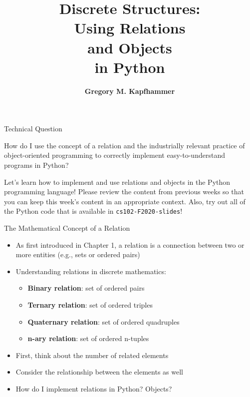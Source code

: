 \documentclass[14pt,aspectratio=169]{beamer}
\title{\vspace*{-.25in}Discrete Structures: \\ Using Relations\\ and Objects\\ in Python}
\author{{\bf Gregory M. Kapfhammer}}
\institute[shortinst]{{\bf Department of Computer Science, Allegheny College}}
\begin{document}
{
  \begin{frame}
    \titlepage
  \end{frame}
}

%
\begin{frame}{Technical Question}
  \hspace*{.25in}
  \begin{minipage}{5in}
    \vspace*{.1in}
    \begin{center}
      {\large How do I use the concept of a relation and the industrially
      relevant practice of object-oriented programming to correctly implement
      easy-to-understand programs in Python?}
    \end{center}
  \end{minipage}
  \vspace{2ex}
  \begin{center}
    \small Let's learn how to implement and use relations and objects in the
    Python programming language! Please review the content from previous weeks
    so that you can keep this week's content in an appropriate context. Also,
    try out all of the Python code that is available in {\tt cs102-F2020-slides}!
  \end{center}
\end{frame}

%
\begin{frame}{The Mathematical Concept of a Relation}
  \begin{itemize}
    \item As first introduced in Chapter 1, a relation is a connection between
      two or more entities (e.g., sets or ordered pairs)
      \vspace*{-.15in}
    \item Understanding relations in discrete mathematics:
      \begin{itemize}
        \item {\bf Binary relation}: set of ordered pairs
        \item {\bf Ternary relation}: set of ordered triples
        \item {\bf Quaternary relation}: set of ordered quadruples
        \item {\bf n-ary relation}: set of ordered n-tuples
      \end{itemize}
      \vspace*{-.2in}
    \item First, think about the number of related elements
      \vspace*{-.2in}
    \item Consider the relationship between the elements as well
      \vspace*{-.2in}
    \item How do I implement relations in Python? Objects?
  \end{itemize}
\end{frame}
\end{document}
